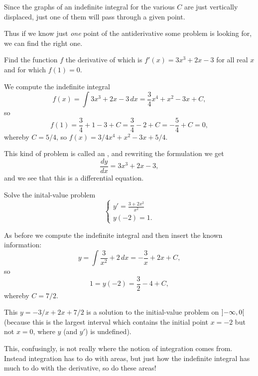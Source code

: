 \noindent
Since the graphs of an indefinite integral for the various $C$ are just vertically displaced, just one of them will pass through a given point.

Thus if we know just \emph{one} point of the antiderivative some problem is looking for, we can find the right one.

\begin{example}
	Find the function $f$ the derivative of which is $f'(x) = 3 x^3 + 2 x - 3$ for all real $x$ and for which $f(1) = 0$.

	We compute the indefinite integral
	\[
		f(x) = \int 3 x^3 + 2 x - 3 \, d x = \frac{3}{4} x^4 + x^2 - 3 x + C,
	\]
	so
	\[
		f(1) = \frac{3}{4} + 1 - 3 + C = \frac{3}{4} - 2 + C = - \frac{5}{4} + C = 0,
	\]
	whereby $C = 5/4$, so $f(x) = 3/4 x^4 + x^2 - 3 x + 5/4$.
\end{example}

\noindent
This kind of problem is called an , and rewriting the formulation we get
\[
	\frac{d y}{d x} = 3 x^3 + 2 x - 3,
\]
and we see that this is a differential equation.

\begin{example}
	Solve the inital-value problem
	\[
		\begin{cases}
			y' = \frac{3 + 2 x^2}{x^2} \\
			y(-2) = 1.
		\end{cases}
	\]

	\noindent
	As before we compute the indefinite integral and then insert the known information:
	\[
		y = \int \frac{3}{x^2} + 2 \, d x = - \frac{3}{x} + 2 x + C,
	\]
	so
	\[
		1 = y(-2) = \frac{3}{2} - 4 + C,
	\]
	whereby $C = 7/2$.

	This $y = -3 / x + 2 x + 7/2$ is a solution to the initial-value problem on $\interval[open]{-\infty}{0}$ (because this is the largest interval which contains the initial point $x = -2$ but not $x = 0$, where $y$ (and $y'$) is undefined).
\end{example}

\noindent
This, confusingly, is not really where the notion of integration comes from.
Instead integration has to do with areas, but just how the indefinite integral has much to do with the derivative, so do these areas!

